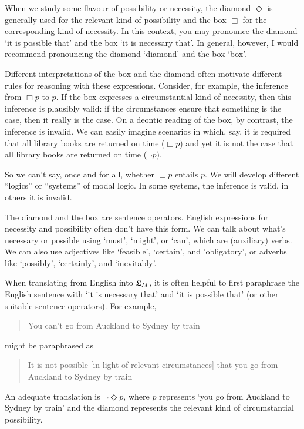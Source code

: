 
When we study some flavour of possibility or necessity, the diamond $\Diamond$
is generally used for the relevant kind of possibility and the box $\Box$ for
the corresponding kind of necessity. In this context, you may pronounce the
diamond `it is possible that' and the box `it is necessary that'. In general,
however, I would recommend pronouncing the diamond `diamond' and the box `box'.


Different interpretations of the box and the diamond often motivate different
rules for reasoning with these expressions. Consider, for example, the inference
from $\Box p$ to $p$. If the box expresses a circumstantial kind of necessity,
then this inference is plausibly valid: if the circumstances ensure that
something is the case, then it really is the case. On a deontic reading of the
box, by contrast, the inference is invalid. We can easily imagine scenarios in
which, say, it is required that all library books are returned on time
($\Box p$) and yet it is not the case that all library books are returned on
time ($\neg p$).

So we can't say, once and for all, whether $\Box p$ entails $p$. We will develop
different ``logics'' or ``systems'' of modal logic. In some systems, the inference is
valid, in others it is invalid.


The diamond and the box are sentence operators. English expressions for
necessity and possibility often don't have this form. We can talk about what's
necessary or possible using `must', `might', or `can', which are (auxiliary)
verbs. We can also use adjectives like `feasible', `certain', and 'obligatory',
or adverbs like `possibly', `certainly', and `inevitably'.


When translating from English into $\mathfrak{L}_{M}$, it is often helpful to first
paraphrase the English sentence with `it is necessary that' and `it is possible
that' (or other suitable sentence operators). For example,
\begin{quote}
  You can't go from Auckland to Sydney by train
\end{quote}
might be paraphrased as
\begin{quote}
  It is not possible [in light of relevant circumstances] that you go from
  Auckland to Sydney by train
\end{quote}
An adequate translation is $\neg\Diamond p$, where $p$ represents `you go from
Auckland to Sydney by train' and the diamond represents the relevant kind of
circumstantial possibility.

